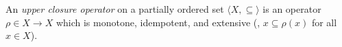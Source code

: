 An \emph{upper closure operator} on a partially ordered set $\langle X, \subseteq \rangle$ is an operator $\rho\in X \to X$ which is monotone, idempotent, and extensive (\ie, $x \subseteq \rho(x)$ for all $x\in X$).
